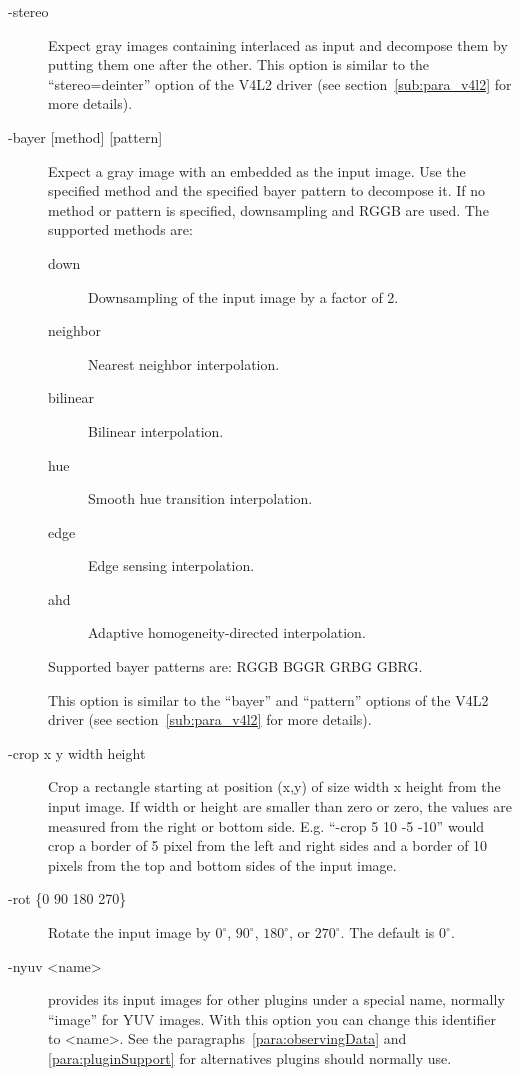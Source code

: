 \begin{description}
\item[-stereo]
  Expect gray images containing interlaced  as
  input and decompose them by putting them one after the other. This
  option is similar to the ``stereo=deinter'' option of the V4L2
  driver (see section~\ref{sub:para_v4l2} for more details).

\item[-bayer [method{]} [pattern{]}]
  Expect a gray image with an embedded  as the
  input image. Use the specified method and the specified bayer
  pattern to decompose it. If no method or pattern is specified,
  downsampling and RGGB are used. The supported methods are:
  \begin{description}
  \item[down] Downsampling of the input image by a factor of 2.
  \item[neighbor] Nearest neighbor interpolation.
  \item[bilinear] Bilinear interpolation.
  \item[hue] Smooth hue transition interpolation.
  \item[edge] Edge sensing interpolation.
  \item[ahd] Adaptive homogeneity-directed interpolation.
  \end{description}
  Supported bayer patterns are: RGGB \textbar{} BGGR \textbar{} GRBG
  \textbar{} GBRG.

  This option is similar to the ``bayer'' and ``pattern'' options of
  the V4L2 driver (see section~\ref{sub:para_v4l2} for more
  details).

\item[-crop x y width height]
  Crop a rectangle starting at position (x,y) of size width x height
  from the input image. If width or height are smaller than zero or
  zero, the values are measured from the right or bottom
  side. E.g. ``-crop 5 10 -5 -10'' would crop a border of 5 pixel
  from the left and right sides and a border of 10 pixels from the
  top and bottom sides of the input image.

\item[-rot \{0 \textbar{} 90 \textbar{} 180 \textbar{} 270\}]
  Rotate the input image by $0^\circ$, $90^\circ$, $180^\circ$, or
  $270^\circ$. The default is $0^\circ$.

\item[-nyuv \textless{}name\textgreater{}] \icewing{} provides its
  input images for other plugins under a special name, normally
  ``image'' for YUV images. With this option you can change this
  identifier to \textless{}name\textgreater{}. See the
  paragraphs~\ref{para:observingData} and \ref{para:pluginSupport}
  for alternatives plugins should normally use.


\end{description}
